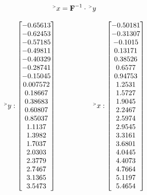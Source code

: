 \documentclass[a4paper, 14pt]{extarticle}
\begin{document}
\begin{equation*}
    \upgt x = \textbf{F}^{-1} \cdot \upgt y
\end{equation*}

\begin{equation*}
    \upgt y: \begin{bmatrix}
        -0.65613 \\
        -0.62453 \\
        -0.57185 \\
        -0.49811 \\
        -0.40329 \\
        -0.28741 \\
        -0.15045 \\
        0.007572 \\
        0.18667 \\
        0.38683 \\
        0.60807 \\
        0.85037 \\
        1.1137 \\
        1.3982 \\
        1.7037 \\
        2.0303 \\
        2.3779 \\
        2.7467 \\
        3.1365 \\
        3.5473 \\
        \end{bmatrix}
    \hspace{50pt}
    \upgt x: \begin{bmatrix}
        -0.50181 \\
        -0.31307 \\
        -0.1015 \\
        0.13171 \\
        0.38526 \\
        0.6577 \\
        0.94753 \\
        1.2531 \\
        1.5727 \\
        1.9045 \\
        2.2467 \\
        2.5974 \\
        2.9545 \\
        3.3161 \\
        3.6801 \\
        4.0445 \\
        4.4073 \\
        4.7664 \\
        5.1197 \\
        5.4654 \\
        \end{bmatrix}
\end{equation*}
\end{document}

